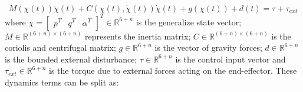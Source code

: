 \documentclass[letterpaper, 10 pt, conference]{ieeeconf}  %
\begin{document}
\begin{equation} \label{General_EL_dynamics}
M(\chi(t))\ddot{\chi}(t) + C(\chi(t), \dot{\chi}(t))\dot{\chi}(t) + g(\chi(t)) + d(t) = \tau + \tau_ {ext}   
\end{equation}
where $\chi = \begin{bmatrix} p^T & q^T & \alpha^T\end{bmatrix}^T \in \mathbb{R}^{6+n}$ is the generalize state vector; $M\in \mathbb{R}^{(6+n)\times (6+n)}$ represents the
inertia matrix; $C\in \mathbb{R}^{(6+n)\times (6+n)}$ is the coriolis and centrifugal matrix; $g\in \mathbb{R}^{6+n}$ is the
vector of gravity forces; $d\in \mathbb{R}^{6+n}$ is the bounded external disturbance; $\tau\in \mathbb{R}^{6+n}$ is the control input vector and $\tau_ {ext} \in \mathbb{R}^{6+n}$ is the torque due to external forces acting on the end-effector. These dynamics terms can be split as:
\end{document}
